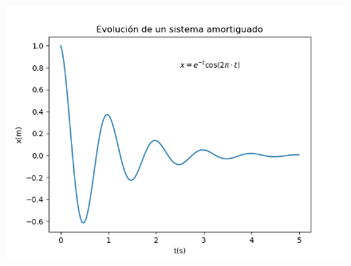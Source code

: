     \begin{figure}
    \centering
    \includegraphics[width=0.75\linewidth]{figuras/plot_text.png}
    \label{fig:plot_text}
\end{figure}

